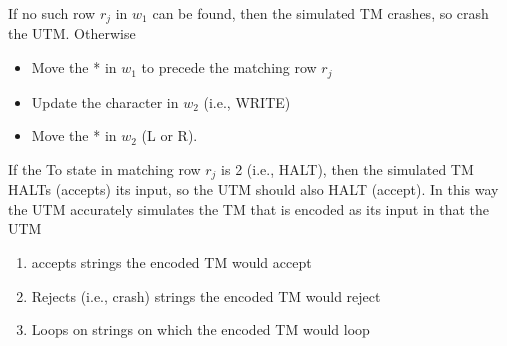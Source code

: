 \documentclass{report}
\begin{document}
\begin{itemize}
            If no such row $r_{j}$ in $w_{1}$ can be found, then the simulated TM crashes, so crash the UTM. Otherwise
            \begin{itemize}
                \item Move the * in $w_{1}$ to precede the matching row $r_{j}$
                \item Update the character in $w_{2}$ (i.e., WRITE)
                \item Move the * in $w_{2}$ (L or R).
            \end{itemize}
            \bigbreak \noindent 
            If the To state in matching row $r_{j}$ is 2 (i.e., HALT), then the simulated TM HALTs (accepts) its input, so the UTM should also HALT (accept).
            \bigbreak \noindent 
            In this way the UTM accurately simulates the TM that is encoded as its input in that the UTM
            \begin{enumerate}
                \item accepts strings the encoded TM would accept
                \item Rejects (i.e., crash) strings the encoded TM would reject
                \item Loops on strings on which the encoded TM would loop


\end{enumerate}
\end{itemize}
\end{document}
